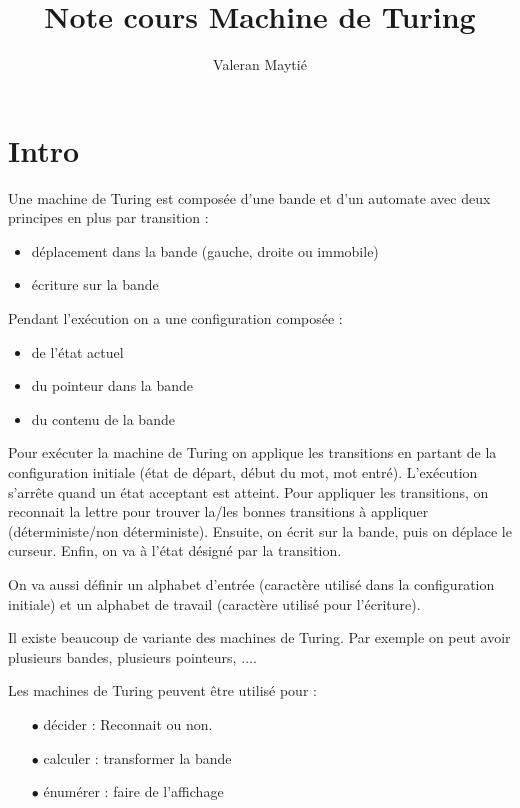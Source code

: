 \documentclass{article}
\title{Note cours Machine de Turing}
\author{Valeran Maytié}
\date{}
\theoremstyle{plain}
\theoremstyle{nonumberplain}
\begin{document}
\maketitle{}
\tableofcontents

\newpage

\section{Intro}

  Une machine de Turing est composée d'une bande et
  d'un automate avec deux principes en plus par transition : 
\begin{itemize}
  \item déplacement dans la bande (gauche, droite ou immobile)
  \item écriture sur la bande
\end{itemize}

  Pendant l'exécution on a une configuration composée :
  \begin{itemize}
    \item de l'état actuel
    \item du pointeur dans la bande 
    \item du contenu de la bande
  \end{itemize}

  Pour exécuter la machine de Turing on applique les transitions 
  en partant de la configuration initiale (état de départ, début du mot, mot entré).
  L'exécution s'arrête quand un état acceptant est atteint. Pour appliquer les transitions, 
  on reconnait la lettre pour trouver la/les bonnes transitions à 
  appliquer (déterministe/non déterministe). Ensuite, on écrit sur la bande, 
  puis on déplace le curseur. Enfin, on va à l'état désigné par la transition.

  On va aussi définir un alphabet d'entrée (caractère utilisé dans 
  la configuration initiale)
  et un alphabet de travail (caractère utilisé pour l'écriture).

  Il existe beaucoup de variante des machines de Turing. Par exemple on peut avoir 
  plusieurs bandes, plusieurs pointeurs, $\ldots$.

  Les machines de Turing peuvent être utilisé pour :

  \begin{itemize}
    \item[$\bullet$] décider : Reconnait ou non.
    \item[$\bullet$] calculer : transformer la bande
    \item[$\bullet$] énumérer : faire de l'affichage
  \end{itemize} \vspace{1cm}
\end{document}
